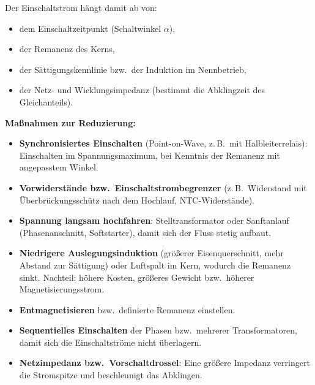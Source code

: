 Der Einschaltstrom hängt damit ab von:
\begin{itemize}[nosep]
  \item dem Einschaltzeitpunkt (Schaltwinkel $\alpha$),
  \item der Remanenz des Kerns,
  \item der Sättigungskennlinie bzw.\ der Induktion im Nennbetrieb,
  \item der Netz- und Wicklungsimpedanz (bestimmt die Abklingzeit des Gleichanteils).
\end{itemize}

\textbf{Maßnahmen zur Reduzierung:}
\begin{itemize}[nosep]
  \item \textbf{Synchronisiertes Einschalten} (Point-on-Wave, z.\,B.\ mit Halbleiterrelais): Einschalten im Spannungsmaximum, bei Kenntnis der Remanenz mit angepasstem Winkel.
  \item \textbf{Vorwiderstände bzw.\ Einschaltstrombegrenzer} (z.\,B.\ Widerstand mit Überbrückungsschütz nach dem Hochlauf, NTC-Widerstände).
  \item \textbf{Spannung langsam hochfahren}: Stelltransformator oder Sanftanlauf (Phasenanschnitt, Softstarter), damit sich der Fluss stetig aufbaut.
  \item \textbf{Niedrigere Auslegungsinduktion} (größerer Eisenquerschnitt, mehr Abstand zur Sättigung) oder Luftspalt im Kern, wodurch die Remanenz sinkt. Nachteil: höhere Kosten, größeres Gewicht bzw.\ höherer Magnetisierungsstrom.
  \item \textbf{Entmagnetisieren} bzw.\ definierte Remanenz einstellen.
  \item \textbf{Sequentielles Einschalten} der Phasen bzw.\ mehrerer Transformatoren, damit sich die Einschaltströme nicht überlagern.
  \item \textbf{Netzimpedanz bzw.\ Vorschaltdrossel}: Eine größere Impedanz verringert die Stromspitze und beschleunigt das Abklingen.
\end{itemize}


